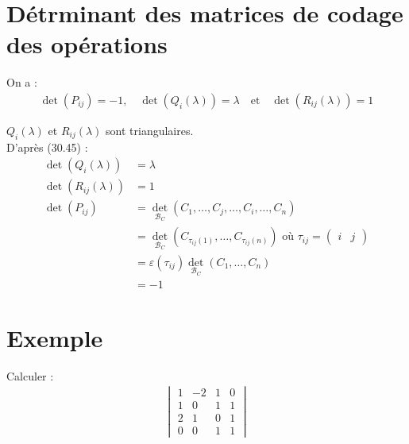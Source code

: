 \documentclass[../main.tex]{subfiles}
\begin{document}
\section{Détrminant des matrices de codage des opérations}
\begin{tcolorbox}[title=Lemme 30.47, title filled=false, colframe=orange, colback=orange!10!white]
    On a : 
    \begin{align*}
        \operatorname{det}(P_{ij}) = -1, \quad \operatorname{det}(Q_i(\lambda)) = \lambda \quad \text{et} \quad \operatorname{det}(R_{ij}(\lambda)) = 1
    \end{align*}
\end{tcolorbox}

\noindent $Q_i(\lambda)$ et $R_{ij}(\lambda)$ sont triangulaires. \\
D'après (30.45) : 
\begin{align*}
    \operatorname{det}(Q_{i}(\lambda)) &= \lambda \\
    \operatorname{det}(R_{ij}(\lambda)) &= 1 \\
    \operatorname{det}(P_{ij}) &= \operatorname{det}_{\mathcal{B}_C}(C_1, \ldots, C_j, \ldots, C_i, \ldots, C_n) \\
    &= \operatorname{det}_{\mathcal{B}_C}(C_{\tau_{ij}(1)}, \ldots, C_{\tau_{ij}(n)}) \text{ où } \tau_{ij} = \begin{pmatrix}
        i & j
    \end{pmatrix} \\
    &= \varepsilon(\tau_{ij}) \operatorname{det}_{\mathcal{B}_C}(C_1, \ldots, C_n) \\
    &= -1
\end{align*}

\section{Exemple}
\begin{tcolorbox}[title=Exemple 30.50, title filled=false, colframe=darkgreen, colback=darkgreen!10!white]
    Calculer : 
    \begin{align*}
        \begin{vmatrix}
            1 & -2 & 1 & 0 \\
            1 & 0 & 1 & 1 \\
            2 & 1 & 0 & 1 \\
            0 & 0 & 1 & 1
        \end{vmatrix}
    \end{align*}
\end{tcolorbox}
\end{document}
